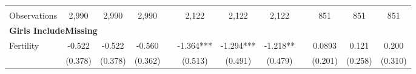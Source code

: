 \begin{landscape}
\begin{table}[htpb!]
\begin{center}
\begin{tabular}{lcccp{2mm}cccp{2mm}ccc}
\begin{footnotesize}\end{footnotesize}&\begin{footnotesize}\end{footnotesize}&\begin{footnotesize}\end{footnotesize}&\begin{footnotesize}\end{footnotesize}&\begin{footnotesize}\end{footnotesize}&\begin{footnotesize}\end{footnotesize}&\begin{footnotesize}\end{footnotesize}&\begin{footnotesize}\end{footnotesize}&\begin{footnotesize}\end{footnotesize}&\begin{footnotesize}\end{footnotesize}&\begin{footnotesize}\end{footnotesize}&\begin{footnotesize}\end{footnotesize}\\Observations&2,990&2,990&2,990&&2,122&2,122&2,122&&851&851&851\\
\multicolumn{12}{l}{\textbf{Girls IncludeMissing}}\\ 
Fertility&-0.522&-0.522&-0.560&&-1.364***&-1.294***&-1.218**&&0.0893&0.121&0.200\\
&(0.378)&(0.378)&(0.362)&&(0.513)&(0.491)&(0.479)&&(0.201)&(0.258)&(0.310)\\

\end{tabular}
\end{center}
\end{table}
\end{landscape}
